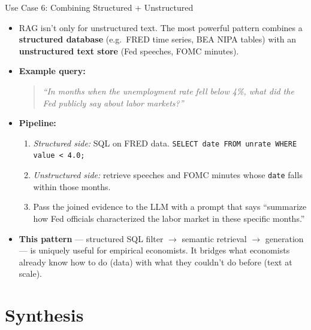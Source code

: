 \begin{frame}{Use Case 6: Combining Structured + Unstructured}
\begin{itemize}
\item RAG isn't only for unstructured text. The most powerful pattern combines a \textbf{structured database} (e.g.\ FRED time series, BEA NIPA tables) with an \textbf{unstructured text store} (Fed speeches, FOMC minutes).

\medskip
\item \textbf{Example query:}
\begin{quote}
\small\itshape
``In months when the unemployment rate fell below 4\%, what did the Fed publicly say about labor markets?''
\end{quote}

\medskip
\item \textbf{Pipeline:}
\begin{enumerate}
    \item \emph{Structured side:} SQL on FRED data. \texttt{SELECT date FROM unrate WHERE value < 4.0;}
    \item \emph{Unstructured side:} retrieve speeches and FOMC minutes whose \texttt{date} falls within those months.
    \item Pass the joined evidence to the LLM with a prompt that says ``summarize how Fed officials characterized the labor market in these specific months.''
\end{enumerate}

\medskip
\item \textbf{This pattern} --- structured SQL filter $\to$ semantic retrieval $\to$ generation --- is uniquely useful for empirical economists. It bridges what economists already know how to do (data) with what they couldn't do before (text at scale).
\end{itemize}
\end{frame}

\section{Synthesis}

